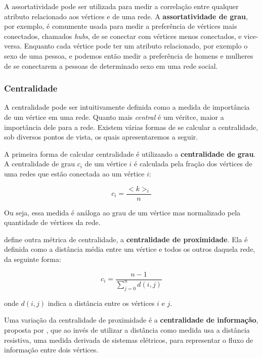 A assortatividade pode ser utilizada para medir a correlação entre qualquer atributo relacionado aos vértices e de uma rede. A \textbf{assortatividade de grau}, por exemplo, é comumente usada para medir a preferência de vértices mais conectados, chamados \textit{hubs}, de se conectar com vértices menos conectados, e vice-versa. Enquanto cada vértice pode ter um atributo relacionado, por exemplo o sexo de uma pessoa, e podemos então medir a preferência de homens e mulheres de se conectarem a pessoas de determinado sexo em uma rede social.

\subsubsection{Centralidade}
\label{section:metodologia:redes:metricas:centralidade}

A centralidade pode ser intuitivamente definida como a medida de importância de um vértice em uma rede. Quanto mais \textit{central} é um véritce, maior a importância dele para a rede. Existem várias formas de se calcular a centralidade, sob diversos pontos de vista, os quais apresentaremos a seguir.

A primeira forma de calcular centralidade é utilizando a \textbf{centralidade de grau}. A centralidade de grau $c_i$ de um vértice $i$ é calculada pela fração dos vértices de uma redes que estão conectada ao um vértice $i$:

\begin{equation}
    c_i = \frac{<k>_i}{n}
\end{equation}

Ou seja, essa medida é análoga ao grau de um vértice mas normalizado pela quantidade de vértices da rede.

 define outra métrica de centralidade, a \textbf{centralidade de proximidade}. Ela é definida como a distância média entre um vértice e todos os outros daquela rede, da seguinte forma:

\begin{equation}
    c_i = \frac{n-1}{\sum\limits_{j=0}^{n} d(i,j)}
\end{equation}

onde $d(i,j)$ indica a distância entre os vértices $i$ e $j$.

Uma variação da centralidade de proximidade é a \textbf{centralidade de informação}, proposta por , que ao invés de utilizar a distância como medida usa a distância resistiva, uma medida derivada de sistemas elétricos, para representar o fluxo de informação entre dois vértices.

